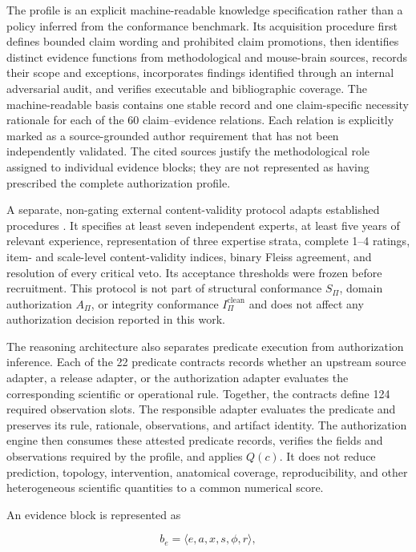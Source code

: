 \documentclass[11pt,a4paper]{article}
\begin{document}
The profile is an explicit machine-readable knowledge specification rather
than a policy inferred from the conformance benchmark. Its acquisition
procedure first defines bounded claim wording and prohibited claim
promotions, then identifies distinct evidence functions from methodological
and mouse-brain sources, records their scope and exceptions, incorporates
findings identified through an internal adversarial audit, and verifies
executable and bibliographic coverage. The machine-readable basis contains
one stable record and one claim-specific necessity rationale for each of the
60 claim--evidence relations. Each relation is explicitly marked as a
source-grounded author requirement that has not been independently validated.
The cited sources justify the methodological role assigned to individual
evidence blocks; they are not represented as having prescribed the complete
authorization profile.

A separate, non-gating external content-validity protocol adapts established
procedures \citep{lynn1986content,terwee2018cosmin}. It specifies at least
seven independent experts, at least five years of relevant experience,
representation of three expertise strata, complete 1--4 ratings, item- and
scale-level content-validity indices, binary Fleiss agreement, and resolution
of every critical veto. Its acceptance thresholds were frozen before
recruitment. This protocol is not part of structural conformance $S_{\Pi}$,
domain authorization $A_{\Pi}$, or integrity conformance
$I^{\mathrm{clean}}_{\Pi}$ and does not affect any authorization decision
reported in this work.

The reasoning architecture also separates predicate execution from
authorization inference. Each of the 22 predicate contracts records whether
an upstream source adapter, a release adapter, or the authorization adapter
evaluates the corresponding scientific or operational rule. Together, the
contracts define 124 required observation slots. The responsible adapter
evaluates the predicate and preserves its rule, rationale, observations, and
artifact identity. The authorization engine then consumes these attested
predicate records, verifies the fields and observations required by the
profile, and applies $Q(c)$. It does not reduce prediction, topology,
intervention, anatomical coverage, reproducibility, and other heterogeneous
scientific quantities to a common numerical score.

An evidence block is represented as

\begin{equation}
b_e=\langle e,a,x,s,\phi,r\rangle,
\label{eq:evidence-block-v2}
\end{equation}
\end{document}
